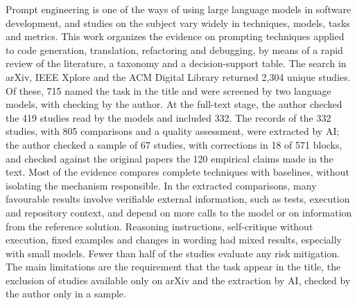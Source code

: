 Prompt engineering is one of the ways of using large language models in software development, and studies on the
subject vary widely in techniques, models, tasks and metrics. This work organizes the evidence on prompting
techniques applied to code generation, translation, refactoring and debugging, by means of a rapid review of the
literature, a taxonomy and a decision-support table. The search in arXiv, IEEE Xplore and the ACM Digital Library
returned 2,304 unique studies. Of these, 715 named the task in the title and were screened by two language
models, with checking by the author. At the full-text stage, the author checked the 419 studies read by the models
and included 332. The records of the 332 studies, with 805 comparisons and a quality assessment, were extracted by
AI; the author checked a sample of 67 studies, with corrections in 18 of 571 blocks, and checked against the
original papers the 120 empirical claims made in the text. Most of the evidence compares complete techniques with
baselines, without isolating the mechanism responsible. In the extracted comparisons, many favourable results
involve verifiable external information, such as tests, execution and repository context, and depend on more calls
to the model or on information from the reference solution. Reasoning instructions, self-critique without
execution, fixed examples and changes in wording had mixed results, especially with small models. Fewer than half
of the studies evaluate any risk mitigation. The main limitations are the requirement that the task appear in the
title, the exclusion of studies available only on arXiv and the extraction by AI, checked by the author only in a
sample.
